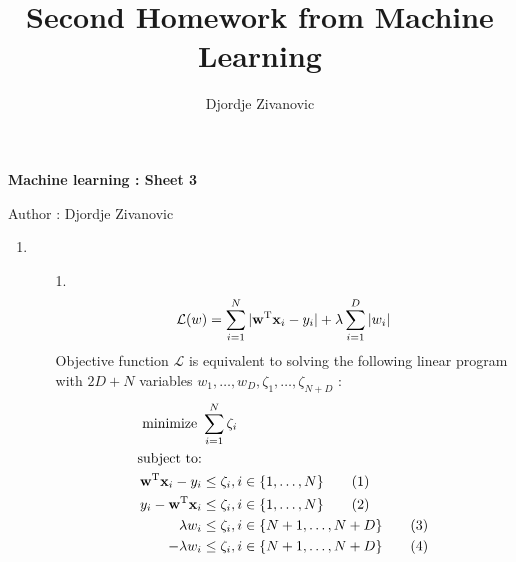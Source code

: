 \documentclass[10pt,a4paper]{article}
\author{Djordje Zivanovic}
\title{Second Homework from Machine Learning}
\begin{document}
\centerline{\large \bf Machine learning : Sheet 3}
\centerline{\large Author : Djordje Zivanovic}
\bigskip
\newcommand{\transpose}[1]{#1 ^ \text{T}}
\newcommand{\mat}[1]{\textbf{\text{{#1}}}}
\newcommand{\vect}[1]{\mat{#1}}
\newcommand{\gradient}[1]{\nabla_{\vect{#1}}}
\newcommand{\der}[1]{\frac{\partial}{\partial #1}}
\newcommand{\numberthis}{\addtocounter{equation}{1}\tag{\theequation}}
\newcommand{\logfun}{\sigma(\transpose{\vect{x}}_i \vect{w})}

\begin{enumerate}
\item 
\begin{enumerate}
\item[1.]
\begin{equation}
\mathcal{L}(w) = \sum_{i=1}^N|\transpose{\vect{w}}\vect{x}_i - y_i| + \lambda\sum_{i=1}^D|w_i| \label{eq:objective}
\end{equation}
Objective function $\mathcal{L}$ is equivalent to solving the following linear program with $2D+ N$ variables $w_1, \ldots, w_D, \zeta_1,\ldots, \zeta_{N+D}$ :
	\begin{align*}
		\text{minimize  } &\sum_{i=1}^{N}\zeta_i\\
		\text{subject to:}\\
		\transpose{\vect{w}}\vect{x}_i - y_i &\leq \zeta_i, i \in \{ 1, \ldots, N \}  \numberthis \label{eq:leftAbsW}\\
		 y_i - \transpose{\vect{w}}\vect{x}_i &\leq \zeta_i, i \in \{ 1, \ldots, N\}  \numberthis \label{eq:rightAbsW} \\
		 \lambda w_i &\leq \zeta_i,  i \in \{ N + 1, \ldots, N + D\} \numberthis 
		 \label{eq:leftAbsL} \\
		 -\lambda w_i &\leq \zeta_i, i \in \{ N + 1, \ldots, N + D\} \numberthis 
		 \label{eq:rightAbsL}\\
\end{align*}
	

\end{enumerate}
\end{enumerate}
\end{document}

